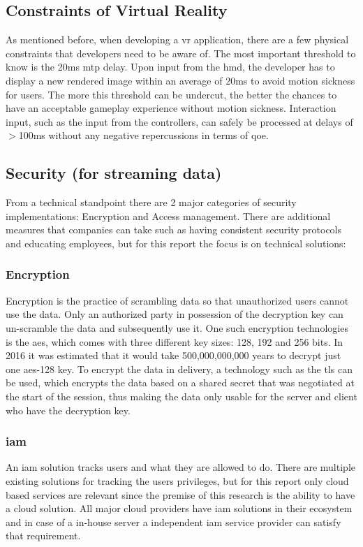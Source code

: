 \subsection{Constraints of Virtual Reality}
\label{ssec:vrphy}
As mentioned before, when developing a \acrshort{vr} application, there are a few physical constraints that developers need to be aware of. The most important threshold to know is the 20\acrshort{ms} \acrshort{mtp} delay. Upon input from the \acrshort{hmd}, the developer has to display a new rendered image within an average of 20\acrshort{ms} to avoid motion sickness for users. The more this threshold can be undercut, the better the chances to have an acceptable gameplay experience without motion sickness. Interaction input, such as the input from the controllers, can safely be processed at delays of $>$100\acrshort{ms} without any negative repercussions in terms of \acrfull{qoe}.

\subsection{Security (for streaming data)}
From a technical standpoint there are 2 major categories of security implementations: Encryption and Access management. There are additional measures that companies can take such as having consistent security protocols and educating employees, but for this report the focus is on technical solutions:

\subsubsection{Encryption}
Encryption is the practice of scrambling data so that unauthorized users cannot use the data. Only an authorized party in possession of the decryption key can un-scramble the data and subsequently use it. 
One such encryption technologies is the \acrfull{aes}, which comes with three different key sizes: 128, 192 and 256 bits. In 2016 it was estimated that it would take 500,000,000,000 years to decrypt just one \acrshort{aes}-128 key.
To encrypt the data in delivery, a technology such as the \acrfull{tls} can be used, which encrypts the data based on a shared secret that was negotiated at the start of the session, thus making the data only usable for the server and client who have the decryption key.
\subsubsection{\acrfull{iam}}
An \acrshort{iam} solution tracks users and what they are allowed to do. There are multiple existing solutions for tracking the users privileges, but for this report only cloud based services are relevant since the premise of this research is the ability to have a cloud solution. All major cloud providers have \acrshort{iam} solutions in their ecosystem and in case of a in-house server a independent \acrshort{iam} service provider can satisfy that requirement.

